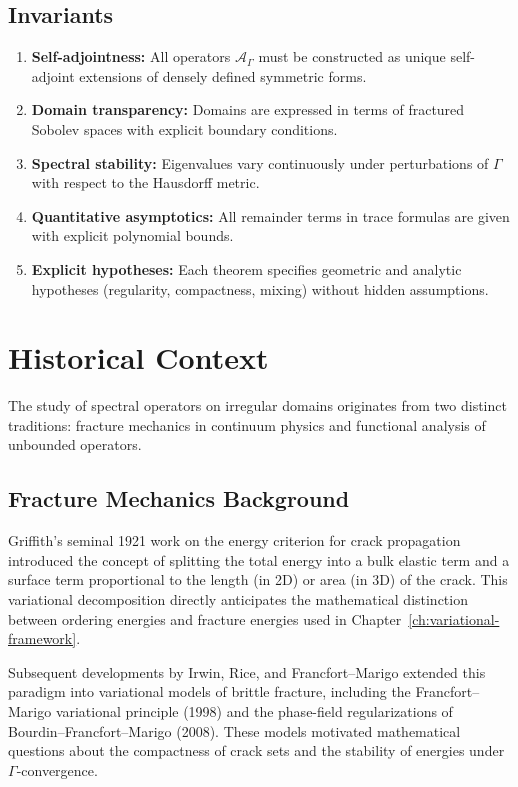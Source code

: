\subsection*{Invariants}
\begin{enumerate}[label=I\arabic*., leftmargin=12mm]
  \item \textbf{Self-adjointness:} All operators $\mathcal{A}_\Gamma$ must be
        constructed as unique self-adjoint extensions of densely defined
        symmetric forms.
  \item \textbf{Domain transparency:} Domains are expressed in terms of
        fractured Sobolev spaces with explicit boundary conditions.
  \item \textbf{Spectral stability:} Eigenvalues vary continuously under
        perturbations of $\Gamma$ with respect to the Hausdorff metric.
  \item \textbf{Quantitative asymptotics:} All remainder terms in trace formulas
        are given with explicit polynomial bounds.
  \item \textbf{Explicit hypotheses:} Each theorem specifies geometric and
        analytic hypotheses (regularity, compactness, mixing) without hidden
        assumptions.
\end{enumerate}

\section{Historical Context}
The study of spectral operators on irregular domains originates from two
distinct traditions: fracture mechanics in continuum physics and functional
analysis of unbounded operators.

\subsection{Fracture Mechanics Background}
Griffith's seminal 1921 work on the energy criterion for crack propagation
introduced the concept of splitting the total energy into a bulk elastic term
and a surface term proportional to the length (in 2D) or area (in 3D) of the
crack. This variational decomposition directly anticipates the mathematical
distinction between ordering energies and fracture energies used in
Chapter~\ref{ch:variational-framework}.

Subsequent developments by Irwin, Rice, and Francfort--Marigo extended this
paradigm into variational models of brittle fracture, including the
Francfort--Marigo variational principle (1998) and the phase-field
regularizations of Bourdin--Francfort--Marigo (2008). These models motivated
mathematical questions about the compactness of crack sets and the stability
of energies under $\Gamma$-convergence.


